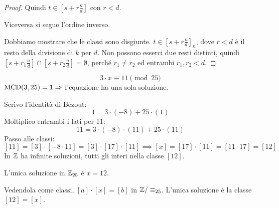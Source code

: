 \begin{enumerate}
\begin{proof}
    Quindi $t \in \left[ s + r \frac{n}{d} \right]$ con $r < d$.

    Viceversa si segue l'ordine inverso.

    Dobbiamo mostrare che le classi sono disgiunte. $t \in \left[s + r \frac{n}{d} \right]_{n}$, dove $r < d$ \`e il resto della divisione di $k$ per $d$. Non possono esserci due resti distinti, quindi $\left[s + r_1 \frac{n}{d} \right] \cap \left[s + r_2 \frac{n}{d} \right] = \emptyset$, perch\'e $r_1 \neq r_2$ ed entrambi $r_1, r_2 < d$.
    \end{proof}

\end{enumerate}






\begin{exmp}
\[
3 \cdot x \equiv 11 \pmod{25}
\]
$\operatorname{MCD}(3, 25) = 1 \Rightarrow$ l'equazione ha una sola soluzione.

Scrivo l'identit\`a di B\'ezout:
\[
1 = 3 \cdot (-8) + 25 \cdot (1)
\]
Moltiplico entrambi i lati per 11:
\[
11 = 3 \cdot (-8) \cdot (11) + 25 \cdot (11)
\]
Passo alle classi:
\[
[11] = [3] \cdot [-8 \cdot 11] = [3] \cdot [17] \cdot [11] \implies [x] = [17] \cdot [11] = [11 \cdot 17] = [12]
\]
In $\mathbb{Z}$ ha infinite soluzioni, tutti gli interi nella classe $[12]$.

L'unica soluzione in $\mathbb{Z}_{25}$ \`e $x = 12$.

Vedendola come classi, $[a] \cdot [x] = [b]$ in $\mathbb{Z} / \equiv_{25}$. L'unica soluzione \`e la classe $[12] = [x]$.
\end{exmp}

